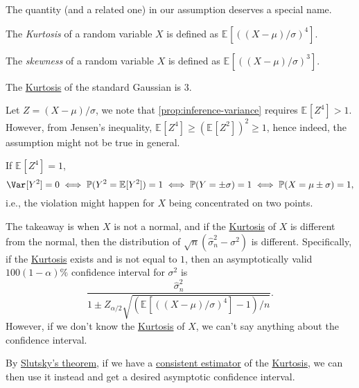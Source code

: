 The quantity (and a related one) in our assumption deserves a special name.

\begin{definition}[Kurtosis]\label{def:Kurtosis}
	The \emph{Kurtosis} of a random variable \(X\) is defined as \(\mathbb{E}_{}[( (X-\mu ) / \sigma )^4]\).
\end{definition}

\begin{definition}[Skewness]\label{def:skewness}
	The \emph{skewness} of a random variable \(X\) is defined as \(\mathbb{E}_{}[( (X-\mu ) / \sigma )^3]\).
\end{definition}

\begin{eg}
	The \hyperref[def:Kurtosis]{Kurtosis} of the standard Gaussian is \(3\).
\end{eg}

Let \(Z = (X-\mu ) / \sigma \), we note that \autoref{prop:inference-variance} requires \(\mathbb{E}_{}[Z^4] > 1\). However, from Jensen's inequality, \(\mathbb{E}_{}[Z^4] \geq \left( \mathbb{E}_{}[Z^2] \right) ^2 \geq 1\), hence indeed, the assumption might not be true in general.

\begin{eg}
	If \(\mathbb{E}_{}[Z^4] = 1\),
	\[
		\Var_{}[Y^2] = 0
		\iff \mathbb{P} (Y^2 = \mathbb{E}_{}[Y^2] ) = 1
		\iff \mathbb{P} (Y = \pm \sigma ) = 1
		\iff \mathbb{P} (X = \mu \pm \sigma ) = 1,
	\]
	i.e., the violation might happen for \(X\) being concentrated on two points.
\end{eg}

The takeaway is when \(X\) is not a normal, and if the \hyperref[def:Kurtosis]{Kurtosis} of \(X\) is different from the normal, then the distribution of \(\sqrt{n} (\hat{\sigma} _n^2 - \sigma ^2)\) is different. Specifically, if the \hyperref[def:Kurtosis]{Kurtosis} exists and is not equal to \(1\), then an asymptotically valid \(100 (1 - \alpha )\%\) confidence interval for \(\sigma ^2\) is
\[
	\frac{\hat{\sigma} _n^2}{1 \pm Z_{\alpha / 2} \sqrt{(\mathbb{E}_{}[((X - \mu ) / \sigma )^4]  - 1) / n} }.
\]
However, if we don't know the \hyperref[def:Kurtosis]{Kurtosis} of \(X\), we can't say anything about the confidence interval.

\begin{intuition}
	By \hyperref[thm:Slutsky]{Slutsky's theorem}, if we have a \hyperref[def:consistent]{consistent estimator} of the \hyperref[def:Kurtosis]{Kurtosis}, we can then use it instead and get a desired asymptotic confidence interval.
\end{intuition}